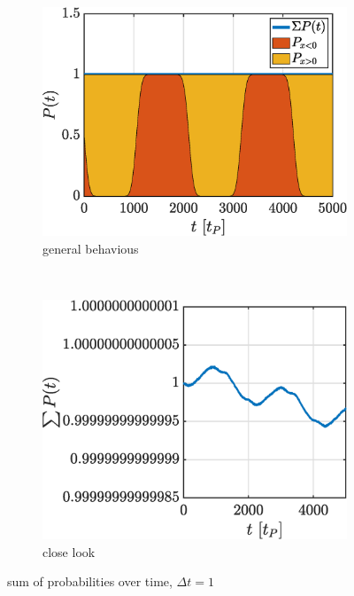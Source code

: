 \documentclass[a4paper,12pt,twoside]{article}
\begin{document}
    \begin{figure}[h]
      \begin{subfigure}[t]{0.45\textwidth}
        \centering
        \includegraphics[width=\textwidth]{graphs/i_ptotcool.eps}
        \caption{general behavious}
        \label{fig:i_ptot_cool}
      \end{subfigure}
      ~
      \begin{subfigure}[t]{0.45\textwidth}
        \centering
        \includegraphics[width=\textwidth]{graphs/i_ptot.eps}
        \caption{close look}
        \label{fig:i_ptot_ugly}
      \end{subfigure}
      \caption{sum of probabilities over time, $\Delta t = 1$}
      \label{fig:i_ptot}
    \end{figure}
\end{document}
